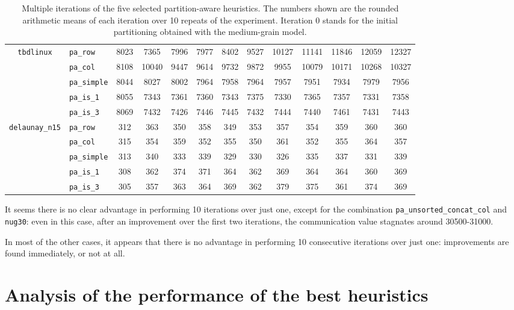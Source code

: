 \begin{table}
\begin{tabular}{|c|l|c||c|c|c|c|c|c|c|c|c|c|}
		\multirow{5}{*}{\texttt{tbdlinux}}		&\verb|pa_row| & 8023 & 7365  & 7996  & 7977  & 8402  & 9527 & 10127 & 11141 & 11846 & 12059 & 12327 \\ 
		&\verb|pa_col| & 8108 & 10040  & 9447  & 9614  & 9732  & 9872  & 9955 & 10079 & 10171 & 10268 & 10327 \\ 
		&\verb|pa_simple| & 8044 & 8027 & 8002 & 7964 & 7958 & 7964 & 7957 & 7951 & 7934 & 7979 & 7956 \\
		&\verb|pa_is_1| & 8055 & 7343 & 7361 & 7360 & 7343 & 7375 & 7330 & 7365 & 7357 & 7331 & 7358 \\
		&\verb|pa_is_3| & 8069 & 7432 & 7426 & 7446 & 7445 & 7432 & 7444 & 7440 & 7461 & 7431 & 7443 \\ \hline
		\multirow{5}{*}{\texttt{delaunay\_n15}}		&\verb|pa_row| & 312 & 363 &  350 &  358 &  349 &  353 &  357 &  354  & 359 &  360 &  360 \\ 
		&\verb|pa_col| & 315 & 354 & 359 & 352 & 355 & 350 & 361 & 352 & 355 & 364 & 357 \\ 
		&\verb|pa_simple| & 313 & 340 & 333 & 339 & 329 & 330 & 326 & 335 & 337 & 331 & 339 \\
		&\verb|pa_is_1| & 308 & 362 & 374 & 371 & 364 & 362 & 369 & 364 & 364 & 360 & 369 \\
		&\verb|pa_is_3| & 305 & 357 & 363 & 364 & 369 & 362 & 379 & 375 & 361 & 374 & 369 \\\hline
	\end{tabular}
	\caption{Multiple iterations of the five selected partition-aware heuristics. The numbers shown are the rounded arithmetic means of each iteration over 10 repeats of the experiment. Iteration 0 stands for the initial partitioning obtained with the medium-grain model.} \label{tab:iterations}
\end{table}

It seems there is no clear advantage in performing 10 iterations over just one, except for the combination \verb|pa_unsorted_concat_col| and \verb|nug30|: even in this case, after an improvement over the first two iterations, the communication value stagnates around 30500-31000.

In most of the other cases, it appears that there is no advantage in performing 10 consecutive iterations over just one: improvements are found immediately, or not at all.

\section{Analysis of the performance of the best heuristics} \label{sec:final_tests}

